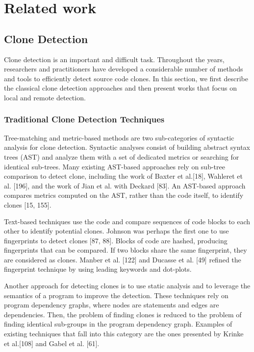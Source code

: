 \documentclass[12pt]{report}
\begin{document}
\chapter{Related work}\label{related-work}

\section{Clone Detection}\label{clone-detection}

Clone detection is an important and difficult task. Throughout the
years, researchers and practitioners have developed a considerable
number of methods and tools to efficiently detect source code clones. In
this section, we first describe the classical clone detection approaches
and then present works that focus on local and remote detection.

\subsection{Traditional Clone Detection
Techniques}\label{traditional-clone-detection-techniques}

Tree-matching and metric-based methods are two sub-categories of
syntactic analysis for clone detection. Syntactic analyses consist of
building abstract syntax trees (AST) and analyze them with a set of
dedicated metrics or searching for identical sub-trees. Many existing
AST-based approaches rely on sub-tree comparison to detect clone,
including the work of Baxter et al.{[}18{]}, Wahleret et al. {[}196{]},
and the work of Jian et al. with Deckard {[}83{]}. An AST-based approach
compares metrics computed on the AST, rather than the code itself, to
identify clones {[}15, 155{]}.

Text-based techniques use the code and compare sequences of code blocks
to each other to identify potential clones. Johnson was perhaps the
first one to use fingerprints to detect clones {[}87, 88{]}. Blocks of
code are hashed, producing fingerprints that can be compared. If two
blocks share the same fingerprint, they are considered as clones. Manber
et al. {[}122{]} and Ducasse et al. {[}49{]} refined the fingerprint
technique by using leading keywords and dot-plots.

Another approach for detecting clones is to use static analysis and to
leverage the semantics of a program to improve the detection. These
techniques rely on program dependency graphs, where nodes are statements
and edges are dependencies. Then, the problem of finding clones is
reduced to the problem of finding identical sub-groups in the program
dependency graph. Examples of existing techniques that fall into this
category are the ones presented by Krinke et al.{[}108{]} and Gabel et
al. {[}61{]}.
\end{document}
